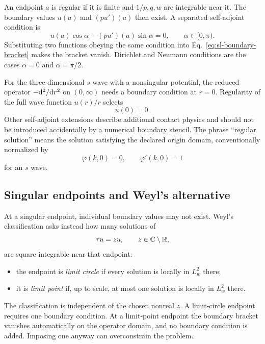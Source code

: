 An endpoint $a$ is regular if it is finite and $1/p,q,w$ are integrable near
it.  The boundary values $u(a)$ and $(pu')(a)$ then exist.  A separated
self-adjoint condition is
\begin{equation}
  u(a)\cos\alpha+(pu')(a)\sin\alpha=0,
  \qquad \alpha\in[0,\pi).
  \label{eq:sl-separated-boundary}
\end{equation}
Substituting two functions obeying the same condition into
Eq.~\eqref{eq:sl-boundary-bracket} makes the bracket vanish.  Dirichlet and
Neumann conditions are the cases $\alpha=0$ and $\alpha=\pi/2$.

For the three-dimensional $s$ wave with a nonsingular potential, the reduced
operator $-\mathrm{d}^2/\mathrm{d} r^2$ on $(0,\infty)$ needs a boundary condition at
$r=0$.  Regularity of the full wave function $u(r)/r$ selects
\begin{equation}
  u(0)=0.
  \label{eq:radial-dirichlet-origin}
\end{equation}
Other self-adjoint extensions describe additional contact physics and should
not be introduced accidentally by a numerical boundary stencil.  The phrase
``regular solution'' means the solution satisfying the declared origin
domain, conventionally normalized by
\begin{equation}
  \varphi(k,0)=0,
  \qquad
  \varphi'(k,0)=1
  \label{eq:regular-solution-initial}
\end{equation}
for an $s$ wave.

\subsection{Singular endpoints and Weyl's alternative}
\label{subsec:weyl-limit-point-circle}

At a singular endpoint, individual boundary values may not exist.  Weyl's
classification asks instead how many solutions of
\begin{equation}
  \tau u=z u,
  \qquad z\in\mathbb{C}\setminus\mathbb{R},
  \label{eq:sl-nonreal-equation}
\end{equation}
are square integrable near that endpoint:
\begin{itemize}
  \item the endpoint is \textit{limit circle} if every solution is locally in
  $L^2_w$ there;
  \item it is \textit{limit point} if, up to scale, at most one solution is
  locally in $L^2_w$ there.
\end{itemize}
The classification is independent of the chosen nonreal $z$.  A limit-circle
endpoint requires one boundary condition.  At a limit-point endpoint the
boundary bracket vanishes automatically on the operator domain, and no
boundary condition is added.  Imposing one anyway can overconstrain the
problem.

